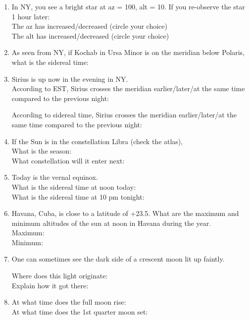 \documentclass[11pt]{article}
\begin{document}
\begin{enumerate}
\vskip 1.0cm
\item
In NY, you see a bright star at az = 100\deg, alt = 10\deg. If you
re-observe the star 1 hour later: \\
The az has increased/decreased  (circle your choice)\\
The alt has increased/decreased  (circle your choice)

\vskip 1.0cm
\item  
As seen from NY, if Kochab in Ursa Minor is
on the meridian below Polaris, what is the sidereal time:

\vskip 1.0cm
\item 
Sirius is up now in the evening in NY.  \\
According to EST, Sirius crosses the meridian earlier/later/at the
same time compared to the previous night:

\vskip 0.5cm
According to sidereal time, Sirius crosses the meridian earlier/later/at the
same time compared to the previous night: 

\vskip 1.0cm
\item
If the Sun is in the constellation Libra (check the atlas),  \\
What is the season: \\
What constellation will it enter next:
 
\vskip 1.0cm
\item
Today is the vernal equinox.\\
What is the sidereal time at noon today: \\

What is the sidereal time at 10 pm tonight:


\item
Havana, Cuba, is close to a latitude of +23.5\deg. 
What are the maximum and minimum altitudes of the sun at noon in Havana
during the year. \\
Maximum: \\
Minimum:

\vskip 1.0cm
\item
One can sometimes see the dark side of a crescent moon lit up
faintly.

\smallskip
Where does this light originate: \\
Explain how it got there:



\vskip 1.0cm
\item
At what time does the full moon rise: \\
At what time does the 1st quarter moon set:


\end{enumerate}
\end{document}
